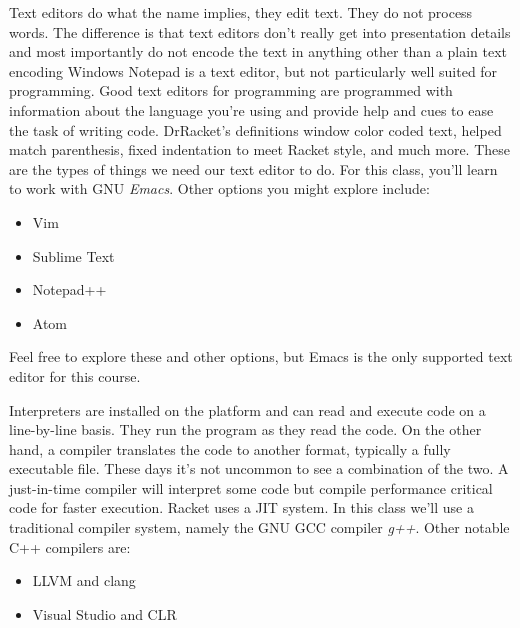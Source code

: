 \documentclass[]{tufte-handout}
\begin{document}
Text editors do what the name implies, they edit text. They do not process words. The difference is that text editors don't really get into presentation details and most importantly do not encode the text in anything other than a plain text encoding  Windows Notepad is a text editor, but not particularly well suited for programming. Good text editors for programming are programmed with information about the language you're using and provide help and cues to ease the task of writing code.  DrRacket's definitions window color coded text, helped match parenthesis, fixed indentation to meet Racket style, and much more.  These are the types of things we need our text editor to do. For this class, you'll learn to work with GNU \textit{Emacs}. Other options you might explore include:
\begin{itemize}
\item Vim
\item Sublime Text
\item Notepad++
\item Atom 
\end{itemize}
Feel free to explore these and other options, but Emacs is the only supported text editor for this course.

Interpreters are installed on the platform and can read and execute code on a line-by-line basis. They run the program as they read the code. On the other hand, a compiler translates the code to another format, typically a fully executable file. These days it's not uncommon to see a combination of the two. A just-in-time compiler will interpret some code but compile performance critical code for faster execution. Racket uses a JIT system.  In this class we'll use a traditional compiler system, namely the GNU GCC compiler \textit{g++}. Other notable C++ compilers are:
\begin{itemize}
\item LLVM and clang 	
\item Visual Studio and CLR 
\end{itemize}
\end{document}
